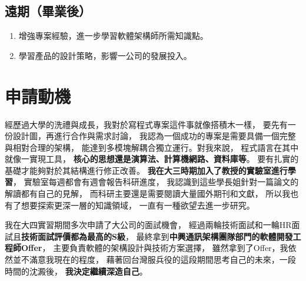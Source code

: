\documentclass[classical]{einfart}
\providecommand{\tightlist}{%
  \setlength{\itemsep}{0pt}\setlength{\parskip}{0pt}}
\begin{document}
\subsection{遠期（畢業後）}

\begin{enumerate}
  \def\labelenumi{\arabic{enumi}.}
  \tightlist
  \item
    增強專案經驗，進一步學習軟體架構師所需知識點。
  \item
    學習產品的設計策略，影響一公司的發展投入。
\end{enumerate}


\section{申請動機}

經歷過大學的洗禮與成長，我對於寫程式專案這件事就像搭積木一樣，
要先有一份設計圖，再進行合作與需求討論，
我認為一個成功的專案是需要具備一個完整與相對合理的架構，
能達到多模塊解耦合獨立運行。對我來說，
程式語言在其中就像一實現工具，
\textbf{核心的思想還是演算法、計算機網路、資料庫等}。
要有扎實的基礎才能夠對於其結構進行修正改善。
\textbf{我在大三時期加入了教授的實驗室進行學習}，
實驗室每週都會有週會報告科研進度，
我認識到這些學長姐針對一篇論文的解讀都有自己的見解，
而科研主要還是需要閱讀大量國外期刊和文獻，
所以我也有了想要探索更深一層的知識領域，
一直有一種欲望去進一步研究。

我在大四實習期間多次申請了大公司的面試機會，
經過兩輪技術面試和一輪HR面試且\textbf{技術面試評價都為最高的S級}，
最終拿到\textbf{中興通訊架構團隊部門的軟體開發工程師Offer}，
主要負責軟體的架構設計與技術方案選擇，
雖然拿到了Offer，我依然並不滿意我現在的程度，
藉著回台灣服兵役的這段期間思考自己的未來，一段時間的沈澱後，
\textbf{我決定繼續深造自己}。
\end{document}

